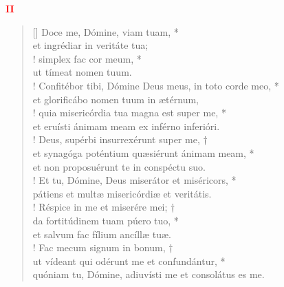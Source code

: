 \begin{center}
\textcolor{red}{\bf II}
\end{center}
\begin{verse}[\versewidth]
Doce me, Dómine, viam tuam, *\\
et ingrédiar in veritáte tua;\\!
\vin simplex fac cor meum, *\\
\vin ut tímeat nomen tuum.\\!
Confitébor tibi, Dómine Deus meus, in toto corde meo, *\\
et glorificábo nomen tuum in ætérnum,\\!
\vin quia misericórdia tua magna est super me, *\\
\vin et eruísti ánimam meam ex inférno inferióri.\\!
Deus, supérbi insurrexérunt super me, †\\
et synagóga poténtium quæsiérunt ánimam meam, *\\
et non proposuérunt te in conspéctu suo.\\!
\vin Et tu, Dómine, Deus miserátor et miséricors, *\\
\vin pátiens et multæ misericórdiæ et veritátis.\\!
Réspice in me et miserére mei; †\\
da fortitúdinem tuam púero tuo, *\\
et salvum fac fílium ancíllæ tuæ.\\!
\vin Fac mecum signum in bonum, †\\
\vin ut vídeant qui odérunt me et confundántur, *\\
\vin quóniam tu, Dómine, adiuvísti me et consolátus es me.\\
\end{verse}
\vspace{1cm}


